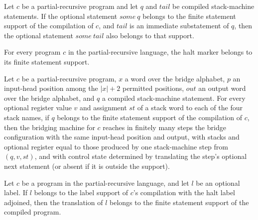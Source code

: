 \begin{lemma}
\label{Turing.bridge_sub}
\leanok
{}
Let $c$ be a partial-recursive program and let $q$ and $tail$ be compiled stack-machine
statements. If the optional statement $some\ q$ belongs to the finite statement support
of the compilation of $c$, and $tail$ is an immediate substatement of $q$, then the
optional statement $some\ tail$ also belongs to that support.
\end{lemma}

\begin{lemma}
\label{Turing.bridge_none}
\leanok
{}
For every program $c$ in the partial-recursive language, the halt marker belongs to its
finite statement support.
\end{lemma}

\begin{lemma}
\label{Turing.bridge_statement}
\leanok
{}
Let $c$ be a partial-recursive program, $x$ a word over the bridge alphabet, $p$ an
input-head position among the $|x|+2$ permitted positions, $out$ an output word over the
bridge alphabet, and $q$ a compiled stack-machine statement. For every optional register
value $v$ and assignment $st$ of a stack word to each of the four stack names, if $q$
belongs to the finite statement support of the compilation of $c$, then the bridging
machine for $c$ reaches in finitely many steps the bridge configuration with the same
input-head position and output, with stacks and optional register equal to those
produced by one stack-machine step from $(q,v,st)$, and with control state determined by
translating the step's optional next statement (or absent if it is outside the support).
\end{lemma}

\begin{lemma}
\label{Turing.bridge_label}
\leanok
{}
Let $c$ be a program in the partial-recursive language, and let $l$ be an optional
label. If $l$ belongs to the label support of $c$'s compilation with the halt label
adjoined, then the translation of $l$ belongs to the finite statement support of the
compiled program.
\end{lemma}

